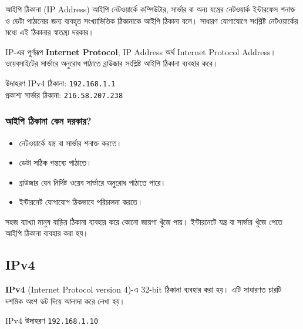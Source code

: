 \begin{definitionbox}{আইপি ঠিকানা (IP Address)}
আইপি নেটওয়ার্কে কম্পিউটার, সার্ভার বা অন্য যন্ত্রের নেটওয়ার্ক ইন্টারফেস শনাক্ত ও ডেটা পাঠানোর জন্য ব্যবহৃত সংখ্যাভিত্তিক ঠিকানাকে আইপি ঠিকানা বলে। সাধারণ যোগাযোগে সংশ্লিষ্ট নেটওয়ার্কের মধ্যে এই ঠিকানার স্বাতন্ত্র্য দরকার।
\end{definitionbox}

IP-এর পূর্ণরূপ \textbf{Internet Protocol}; IP Address অর্থ Internet Protocol Address। ওয়েবসাইটের সার্ভারে অনুরোধ পাঠাতে ব্রাউজার সংশ্লিষ্ট আইপি ঠিকানা ব্যবহার করে।

\begin{examplebox}{উদাহরণ}
IPv4 ঠিকানা: \texttt{192.168.1.1}\\
প্রকাশ্য সার্ভার ঠিকানা: \texttt{216.58.207.238}
\end{examplebox}

\subsubsection{আইপি ঠিকানা কেন দরকার?}

\begin{itemize}
\item নেটওয়ার্কে যন্ত্র বা সার্ভার শনাক্ত করতে।
\item ডেটা সঠিক গন্তব্যে পাঠাতে।
\item ব্রাউজার যেন নির্দিষ্ট ওয়েব সার্ভারে অনুরোধ পাঠাতে পারে।
\item ইন্টারনেট যোগাযোগ ঠিকভাবে পরিচালনা করতে।
\end{itemize}

\begin{boardbox}{সহজ ব্যাখ্যা}
মানুষ বাড়ির ঠিকানা ব্যবহার করে কোনো জায়গা খুঁজে পায়। ইন্টারনেটে যন্ত্র বা সার্ভার খুঁজে পেতে আইপি ঠিকানা ব্যবহার করা হয়।
\end{boardbox}

\subsection{IPv4}

\begin{definitionbox}{}
\textbf{IPv4} (Internet Protocol version 4)-এ 32-bit ঠিকানা ব্যবহার করা হয়। এটি সাধারণত চারটি দশমিক অংশ ডট দিয়ে আলাদা করে লেখা হয়।
\end{definitionbox}

\begin{examplebox}{IPv4 উদাহরণ}
\texttt{192.168.1.10}
\end{examplebox}

